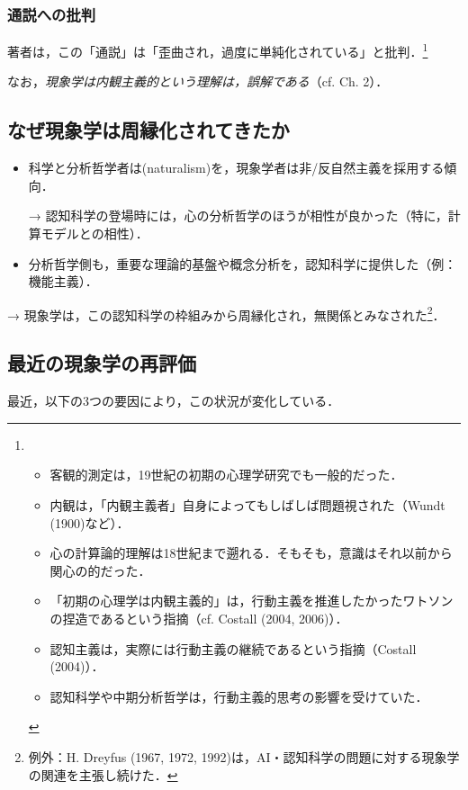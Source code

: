 \documentclass[b5j, 9pt]{ltjsarticle}
\begin{document}
\subsubsection{通説への批判}

著者は，この「通説」は「歪曲され，過度に単純化されている」と批判．\footnote{
  \begin{itemize}
    \item 客観的測定は，19世紀の初期の心理学研究でも一般的だった．
    \item 内観は，「内観主義者」自身によってもしばしば問題視された（Wundt (1900)など）．
    \item 心の計算論的理解は18世紀まで遡れる．そもそも，意識はそれ以前から関心の的だった．
    \item 「初期の心理学は内観主義的」は，行動主義を推進したかったワトソンの捏造であるという指摘（cf. Costall (2004, 2006)）．
    \item 認知主義は，実際には行動主義の継続であるという指摘（Costall (2004)）．
    \item 認知科学や中期分析哲学は，行動主義的思考の影響を受けていた．
  \end{itemize}
}

なお，\emph{現象学は内観主義的という理解は，誤解である}（cf. Ch. 2）．

\subsection{なぜ現象学は周縁化されてきたか}

\begin{itemize}
  \item 科学と分析哲学者は(naturalism)を，現象学者は非/反自然主義を採用する傾向．\par
  → 認知科学の登場時には，心の分析哲学のほうが相性が良かった（特に，計算モデルとの相性）．
  \item 分析哲学側も，重要な理論的基盤や概念分析を，認知科学に提供した（例：機能主義）．
\end{itemize}
→ 現象学は，この認知科学の枠組みから周縁化され，無関係とみなされた\footnote{
  例外：H. Dreyfus (1967, 1972, 1992)は，AI・認知科学の問題に対する現象学の関連を主張し続けた．
}．


\subsection{最近の現象学の再評価}

最近，以下の3つの要因により，この状況が変化している．
\end{document}
